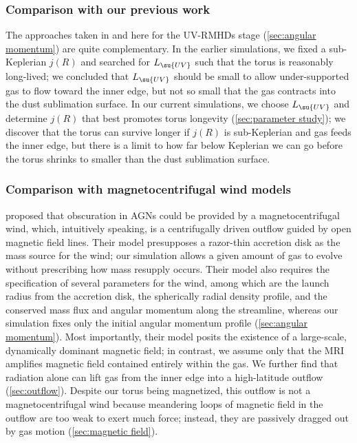 \documentclass[twocolumn]{article}
\newcommand*\uvrmhd{\ac{UV}\protect\nobreakdash-\acp{RMHD}}
\begin{document}
\subsubsection{Comparison with our previous work}

The approaches taken in  and here for the
\uvrmhd{} stage (\cref{sec:angular momentum}) are quite complementary. In the
earlier simulations, we fixed a sub-Keplerian $j(R)$ and searched for
$L_\su{UV}$ such that the torus is reasonably long-lived; we concluded that
$L_\su{UV}$ should be small to allow under-supported gas to flow toward the
inner edge, but not so small that the gas contracts into the dust sublimation
surface. In our current simulations, we choose $L_\su{UV}$ and determine $j(R)$
that best promotes torus longevity (\cref{sec:parameter study}); we discover
that the torus can survive longer if $j(R)$ is sub-Keplerian and gas feeds the
inner edge, but there is a limit to how far below Keplerian we can go before
the torus shrinks to smaller than the dust sublimation surface.

\subsubsection{Comparison with magnetocentrifugal wind models}

 proposed that obscuration in \acp{AGN} could be
provided by a magnetocentrifugal wind, which, intuitively speaking, is a
centrifugally driven outflow guided by open magnetic field lines. Their model
presupposes a razor-thin accretion disk as the mass source for the wind; our
simulation allows a given amount of gas to evolve without prescribing how mass
resupply occurs. Their model also requires the specification of several
parameters for the wind, among which are the launch radius from the accretion
disk, the spherically radial density profile, and the conserved mass flux and
angular momentum along the streamline, whereas our simulation fixes only the
initial angular momentum profile (\cref{sec:angular momentum}). Most
importantly, their model posits the existence of a large-scale, dynamically
dominant magnetic field; in contrast, we assume only that the \ac{MRI}
amplifies magnetic field contained entirely within the gas. We further find
that radiation alone can lift gas from the inner edge into a high-latitude
outflow (\cref{sec:outflow}). Despite our torus being magnetized, this outflow
is not a magnetocentrifugal wind because meandering loops of magnetic field in
the outflow are too weak to exert much force; instead, they are passively
dragged out by gas motion (\cref{sec:magnetic field}).
\end{document}
